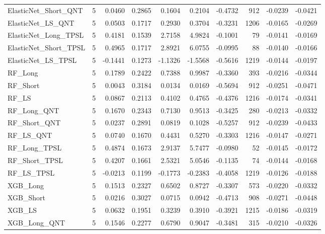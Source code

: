 \begin{tabular}{llrrrrrrrr}
\cline{1-10}
ElasticNet\_Short\_QNT & 5 & 0.0460 & 0.2865 & 0.1604 & 0.2104 & -0.4732 & 912 & -0.0239 & -0.0421 \\
\cline{1-10}
ElasticNet\_LS\_QNT & 5 & 0.0503 & 0.1717 & 0.2930 & 0.3704 & -0.3231 & 1206 & -0.0165 & -0.0269 \\
\cline{1-10}
ElasticNet\_Long\_TPSL & 5 & 0.4181 & 0.1539 & 2.7158 & 4.9824 & -0.1001 & 79 & -0.0141 & -0.0169 \\
\cline{1-10}
ElasticNet\_Short\_TPSL & 5 & 0.4965 & 0.1717 & 2.8921 & 6.0755 & -0.0995 & 88 & -0.0140 & -0.0166 \\
\cline{1-10}
ElasticNet\_LS\_TPSL & 5 & -0.1441 & 0.1273 & -1.1326 & -1.5568 & -0.5616 & 1219 & -0.0144 & -0.0197 \\
\cline{1-10}
RF\_Long & 5 & 0.1789 & 0.2422 & 0.7388 & 0.9987 & -0.3360 & 393 & -0.0216 & -0.0344 \\
\cline{1-10}
RF\_Short & 5 & 0.0043 & 0.3184 & 0.0134 & 0.0169 & -0.5694 & 912 & -0.0251 & -0.0471 \\
\cline{1-10}
RF\_LS & 5 & 0.0867 & 0.2113 & 0.4102 & 0.4765 & -0.4376 & 1216 & -0.0174 & -0.0341 \\
\cline{1-10}
RF\_Long\_QNT & 5 & 0.1670 & 0.2343 & 0.7130 & 0.9513 & -0.3425 & 280 & -0.0213 & -0.0332 \\
\cline{1-10}
RF\_Short\_QNT & 5 & 0.0237 & 0.2891 & 0.0819 & 0.1028 & -0.5257 & 912 & -0.0239 & -0.0433 \\
\cline{1-10}
RF\_LS\_QNT & 5 & 0.0740 & 0.1670 & 0.4431 & 0.5270 & -0.3303 & 1216 & -0.0147 & -0.0271 \\
\cline{1-10}
RF\_Long\_TPSL & 5 & 0.4874 & 0.1673 & 2.9137 & 5.7477 & -0.0980 & 52 & -0.0145 & -0.0172 \\
\cline{1-10}
RF\_Short\_TPSL & 5 & 0.4207 & 0.1661 & 2.5321 & 5.0546 & -0.1135 & 74 & -0.0144 & -0.0168 \\
\cline{1-10}
RF\_LS\_TPSL & 5 & -0.0213 & 0.1199 & -0.1773 & -0.2383 & -0.4058 & 1219 & -0.0126 & -0.0188 \\
\cline{1-10}
XGB\_Long & 5 & 0.1513 & 0.2327 & 0.6502 & 0.8727 & -0.3307 & 573 & -0.0220 & -0.0332 \\
\cline{1-10}
XGB\_Short & 5 & 0.0216 & 0.3027 & 0.0715 & 0.0942 & -0.4713 & 908 & -0.0271 & -0.0448 \\
\cline{1-10}
XGB\_LS & 5 & 0.0632 & 0.1951 & 0.3239 & 0.3910 & -0.3921 & 1215 & -0.0186 & -0.0319 \\
\cline{1-10}
XGB\_Long\_QNT & 5 & 0.1546 & 0.2277 & 0.6790 & 0.9047 & -0.3481 & 315 & -0.0210 & -0.0326 \\

\end{tabular}
